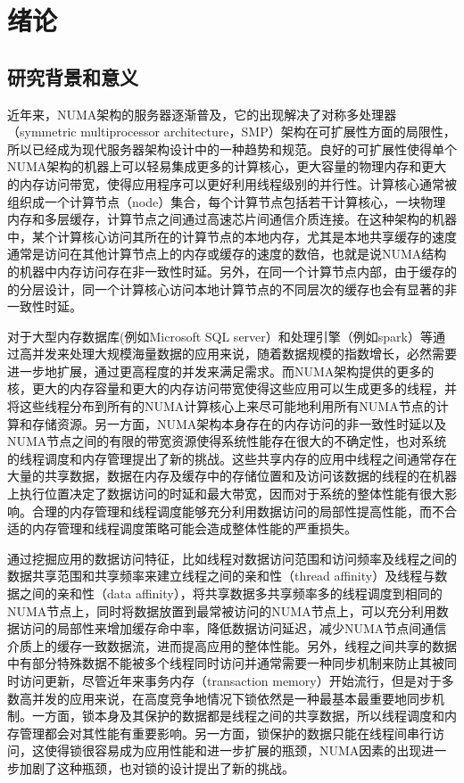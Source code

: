 
\chapter{绪论}
\label{chap:intro}


\section{研究背景和意义}
近年来，NUMA架构的服务器逐渐普及，它的出现解决了对称多处理器（symmetric multiprocessor architecture，SMP）架构在可扩展性方面的局限性，所以已经成为现代服务器架构设计中的一种趋势和规范。良好的可扩展性使得单个NUMA架构的机器上可以轻易集成更多的计算核心，更大容量的物理内存和更大的内存访问带宽，使得应用程序可以更好利用线程级别的并行性。计算核心通常被组织成一个计算节点（node）集合，每个计算节点包括若干计算核心，一块物理内存和多层缓存，计算节点之间通过高速芯片间通信介质连接。在这种架构的机器中，某个计算核心访问其所在的计算节点的本地内存，尤其是本地共享缓存的速度通常是访问在其他计算节点上的内存或缓存的速度的数倍，也就是说NUMA结构的机器中内存访问存在非一致性时延。另外，在同一个计算节点内部，由于缓存的的分层设计，同一个计算核心访问本地计算节点的不同层次的缓存也会有显著的非一致性时延。

对于大型内存数据库(例如Microsoft SQL server）和处理引擎（例如spark）等通过高并发来处理大规模海量数据的应用来说，随着数据规模的指数增长，必然需要进一步地扩展，通过更高程度的并发来满足需求。而NUMA架构提供的更多的核，更大的内存容量和更大的内存访问带宽使得这些应用可以生成更多的线程，并将这些线程分布到所有的NUMA计算核心上来尽可能地利用所有NUMA节点的计算和存储资源。另一方面，NUMA架构本身存在的内存访问的非一致性时延以及NUMA节点之间的有限的带宽资源使得系统性能存在很大的不确定性，也对系统的线程调度和内存管理提出了新的挑战。这些共享内存的应用中线程之间通常存在大量的共享数据，数据在内存及缓存中的存储位置和及访问该数据的线程的在机器上执行位置决定了数据访问的时延和最大带宽，因而对于系统的整体性能有很大影响。合理的内存管理和线程调度能够充分利用数据访问的局部性提高性能，而不合适的内存管理和线程调度策略可能会造成整体性能的严重损失。

通过挖掘应用的数据访问特征，比如线程对数据访问范围和访问频率及线程之间的数据共享范围和共享频率来建立线程之间的亲和性（thread affinity）及线程与数据之间的亲和性（data affinity），将共享数据多共享频率多的线程调度到相同的NUMA节点上，同时将数据放置到最常被访问的NUMA节点上，可以充分利用数据访问的局部性来增加缓存命中率，降低数据访问延迟，减少NUMA节点间通信介质上的缓存一致数据流，进而提高应用的整体性能。另外，线程之间共享的数据中有部分特殊数据不能被多个线程同时访问并通常需要一种同步机制来防止其被同时访问更新，尽管近年来事务内存（transaction memory）开始流行，但是对于多数高并发的应用来说，在高度竞争地情况下锁依然是一种最基本最重要地同步机制。一方面，锁本身及其保护的数据都是线程之间的共享数据，所以线程调度和内存管理都会对其性能有重要影响。另一方面，锁保护的数据只能在线程间串行访问，这使得锁很容易成为应用性能和进一步扩展的瓶颈，NUMA因素的出现进一步加剧了这种瓶颈，也对锁的设计提出了新的挑战。

